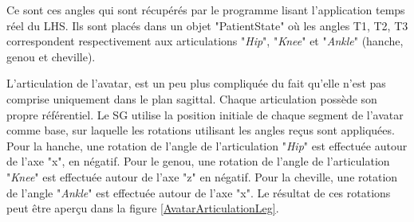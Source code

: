 		\begin{minipage}{\linewidth}
			\label{LHSAngles}
		\end{minipage}\medskip
		
		Ce sont ces angles qui sont récupérés par le programme lisant l'application temps réel du LHS. Ils sont placés dans un objet "PatientState" où les angles T1, T2, T3 correspondent respectivement aux articulations "\textit{Hip}", "\textit{Knee}" et "\textit{Ankle}" (hanche, genou et cheville).
		
		L'articulation de l'avatar, est un peu plus compliquée du fait qu'elle n'est pas comprise uniquement dans le plan sagittal. Chaque articulation possède son propre référentiel. Le SG utilise la position initiale de chaque segment de l'avatar comme base, sur laquelle les rotations utilisant les angles reçus sont appliquées. Pour la hanche, une rotation de l'angle de l'articulation "\textit{Hip}" est effectuée autour de l'axe "x", en négatif. Pour le genou, une rotation de l'angle de l'articulation "\textit{Knee}" est effectuée autour de l'axe "z" en négatif. Pour la cheville, une rotation de l'angle "\textit{Ankle}" est effectuée autour de l'axe "x". Le résultat de ces rotations peut être aperçu dans la figure \ref{AvatarArticulationLeg}.\medskip
		
